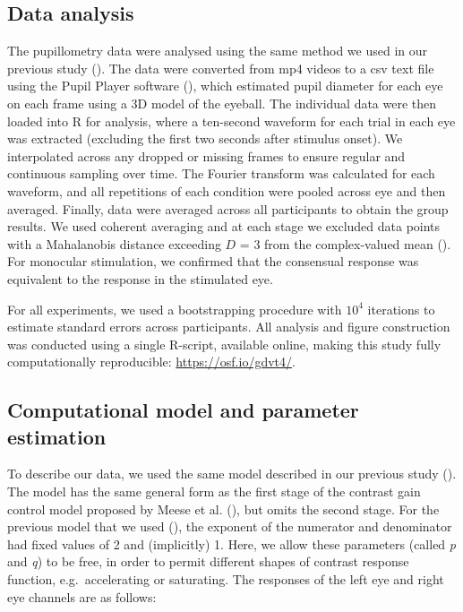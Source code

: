 \documentclass[
]{article}
\begin{document}
\subsection{Data analysis}\label{data-analysis}

The pupillometry data were analysed using the same method we used in our previous study (). The data were converted from mp4 videos to a csv text file using the Pupil Player software (), which estimated pupil diameter for each eye on each frame using a 3D model of the eyeball. The individual data were then loaded into R for analysis, where a ten-second waveform for each trial in each eye was extracted (excluding the first two seconds after stimulus onset). We interpolated across any dropped or missing frames to ensure regular and continuous sampling over time. The Fourier transform was calculated for each waveform, and all repetitions of each condition were pooled across eye and then averaged. Finally, data were averaged across all participants to obtain the group results. We used coherent averaging and at each stage we excluded data points with a Mahalanobis distance exceeding \(D\) = 3 from the complex-valued mean (). For monocular stimulation, we confirmed that the consensual response was equivalent to the response in the stimulated eye.

For all experiments, we used a bootstrapping procedure with \ensuremath{10^{4}} iterations to estimate standard errors across participants. All analysis and figure construction was conducted using a single R-script, available online, making this study fully computationally reproducible: \url{https://osf.io/gdvt4/}.

\subsection{Computational model and parameter estimation}\label{computational-model-and-parameter-estimation}

To describe our data, we used the same model described in our previous study (). The model has the same general form as the first stage of the contrast gain control model proposed by Meese et al. (), but omits the second stage. For the previous model that we used (), the exponent of the numerator and denominator had fixed values of 2 and (implicitly) 1. Here, we allow these parameters (called \emph{p} and \emph{q}) to be free, in order to permit different shapes of contrast response function, e.g.~accelerating or saturating. The responses of the left eye and right eye channels are as follows:
\end{document}
